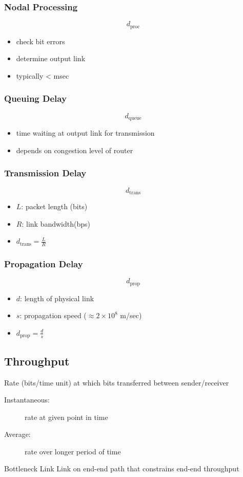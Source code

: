 \subsubsection{Nodal Processing}
\[ d_\text{proc} \]
\begin{itemize}
	\item check bit errors
	\item determine output link
	\item typically < msec
\end{itemize}
\subsubsection{Queuing Delay}
\[ d_\text{queue} \]
\begin{itemize}
	\item time waiting at output link for transmission
	\item depends on congestion level of router
\end{itemize}
\subsubsection{Transmission Delay}
\[ d_\text{trans} \]
\begin{itemize}
	\item $L$: packet length (bits)
	\item $R$: link bandwidth(bps)
	\item $d_\text{trans} = \frac{L}{R}$
\end{itemize}
\subsubsection{Propagation Delay}
\[ d_\text{prop} \]
\begin{itemize}
	\item $d$: length of physical link
	\item $s$: propagation speed ($\approx2\times10^8$ m/sec)
	\item $d_\text{prop} = \frac{d}{s}$
\end{itemize}

\subsection{Throughput}
\begin{leftbar}
	Rate (bits/time unit) at which bits transferred between sender/receiver
\end{leftbar}
\begin{description}
	\item[Instantaneous:] rate at given point in time
	\item[Average:] rate over longer period of time
\end{description}
\begin{note}{Bottleneck Link}
	Link on end-end path that constrains end-end throughput
\end{note}

